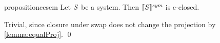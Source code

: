 \begin{restatable}{proposition}{ccsem}\label{prop:par}
  Let $S$ be a system. Then ${\llbracket S \rrbracket^{\textit{sym}}}$ is
  c-closed.
\end{restatable}
\begin{toappendix}
  \ccsem*
\end{toappendix}
\begin{appendixproof}
  Trivial, since closure under swap does not change the projection by
  \cref{lemma:equalProj}.
  \qed
\end{appendixproof}




